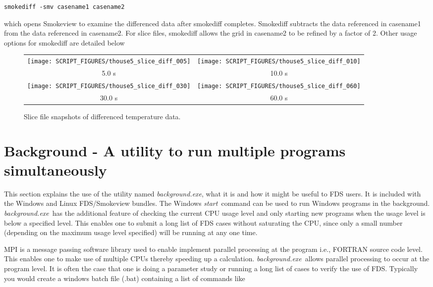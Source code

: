 \documentclass[11pt,twoside]{book}
\begin{document}
\begin{lstlisting}
smokediff -smv casename1 casename2
\end{lstlisting}

\noindent which opens Smokeview to examine the differenced data
after smokediff completes.  Smokediff subtracts the data
referenced in casename1 from the data referenced in casename2.
For slice files, smokediff allows the grid in casename2 to be
refined by a factor of 2.  Other usage options for smokediff are
detailed below



\begin{figure}[\figoptions]
\begin{center}
\begin{tabular}{cc}
\texttt{[image: SCRIPT\_FIGURES/thouse5\_slice\_diff\_005]}&
\texttt{[image: SCRIPT\_FIGURES/thouse5\_slice\_diff\_010]}\\
5.0 s&10.0 s\\
\texttt{[image: SCRIPT\_FIGURES/thouse5\_slice\_diff\_030]}&
\texttt{[image: SCRIPT\_FIGURES/thouse5\_slice\_diff\_060]}\\
30.0 s&60.0 s
\end{tabular}
\end{center}
\caption [Slice file snapshots of differenced temperature data.]
{Slice file snapshots of differenced temperature data.}
\label{figdiffslice}%
\end{figure}

\section{Background - A utility to run multiple programs simultaneously}

This section explains the use of the utility named {\em background.exe}, what it is and
how it might be useful to FDS users.  It is included with the Windows and Linux FDS/Smokeview
bundles.  The Windows {\em start}\ command can be used to run Windows programs in the
background.  {\em background.exe}\ has the additional feature of checking the current
CPU usage level and only starting new programs when the usage level is below a specified
level.  This enables one to submit a long list of FDS cases without saturating the CPU,
since only a small number (depending on the maximum usage level specified) will be
running at any one time.

MPI is a message passing software library used to enable implement parallel processing
at the program i.e., FORTRAN source code level.  This enables one to make use of
multiple CPUs thereby speeding up a calculation. {\em background.exe}\ allows parallel
processing to occur at the program level.  It is often the case that one is doing a
parameter study or running a long list of cases to verify the use of FDS. Typically you
would create a windows batch file (.bat) containing a list of commands like
\end{document}

